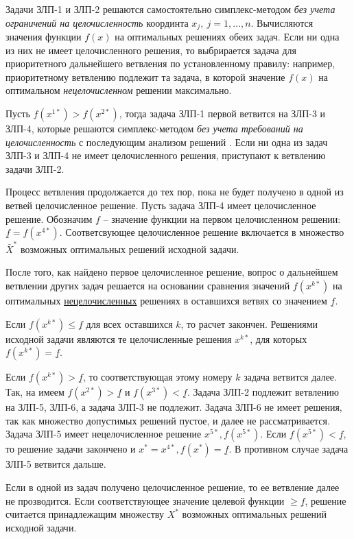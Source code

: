 \documentclass[%
	11pt,
	a4paper,
	utf8,
		]{article}
\begin{document}
Задачи ЗЛП-1 и ЗЛП-2 решаются самостоятельно симплекс-методом \emph{без учета ограничений на целочисленность} координта $ x_j, \ j = 1, \ldots, n $. Вычисляются значения функции $ f(x) $ на оптимальных решениях обеих задач. Если ни одна из них не имеет целочисленного решения, то выбрирается задача для приоритетного дальнейшего ветвления по установленному правилу: например, приоритетному ветвлению подлежит та задача, в которой значение $ f(x) $ на оптимальном \emph{нецелочисленном} решении максимально.

Пусть $ f(x^{1*}) > f(x^{2*}) $, тогда задача ЗЛП-1 первой ветвится на ЗЛП-3 и ЗЛП-4, которые решаются симплекс-методом \emph{без учета требований на целочисленность} с последующим анализом решений \cite[]{panteleev}. Если ни одна из задач ЗЛП-3 и ЗЛП-4 не имеет целочисленного решения, приступают к ветвлению задачи ЗЛП-2.

Процесс ветвления продолжается до тех пор, пока не будет получено в одной из ветвей целочисленное решение. Пусть задача ЗЛП-4 имеет целочисленное решение.  Обозначим $ \underline{f} $ -- значение функции на первом целочисленном решении: $ \underline{f} = f(x^{4*}) $. Соответсвующее целочисленное решение включается в множество $ \bar{X}^* $ возможных оптимальных решений исходной задачи.

После того, как найдено первое целочисленное решение, вопрос о дальнейшем ветвлении других задач решается на основании сравнения значений $ f(x^{k*}) $ на оптимальных \underline{нецелочисленных} решениях в оставшихся ветвях со значением $ \underline{f} $.

Если $ f(x^{k*}) \leqslant \underline{f} $ для всех оставшихся $ k $, то расчет закончен. Решениями исходной задачи являются те целочисленные решения $ x^{k*} $, для которых $ f(x^{k*}) = \underline{f} $.

Если $ f(x^{k*}) > \underline{f} $, то соответствующая этому номеру $ k $ задача ветвится далее. Так, на  имеем $ f(x^{2*}) > \underline{f} $ и $ f(x^{3*}) < \underline{f} $. Задача ЗЛП-2 подлежит ветвлению на ЗЛП-5, ЗЛП-6, а задача ЗЛП-3 не подлежит. Задача ЗЛП-6 не имеет решения, так как множество допустимых решений пустое, и далее не рассматривается. Задача ЗЛП-5 имеет нецелочисленное решение $ x^{5*}, f(x^{5*}) $. Если $ f(x^{5*}) < \underline{f} $, то решение задачи закончено и $ x^* = x^{4*}, f(x^*) = \underline{f} $. В противном случае задача ЗЛП-5 ветвится дальше.

Если в одной из задач получено целочисленное решение, то ее ветвление далее не прозводится. Если соответствующее значение целевой функции $ \geqslant \underline{f} $, решение считается принадлежащим множеству $ X^* $ возможных оптимальных решений исходной задачи.
\end{document}
